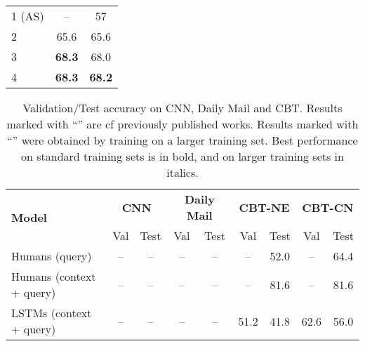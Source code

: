 \documentclass[11pt,a4paper]{article}
\begin{document}
\begin{table*}[ht]
{\begin{tabular}{@{}l|c|c@{}}
	&	&	\\ \midrule
1 (AS)                    & --               & 57             \\
2			                               & 65.6               & 65.6              \\
3                                & \textbf{68.3}               & 68.0              \\
4                                & \textbf{68.3}               & \textbf{68.2}              \\\bottomrule
\end{tabular}
}
\end{table*}

\begin{table*}[ht]
\caption{\small Validation/Test accuracy  on CNN, Daily Mail and CBT.
Results marked with ``'' are cf previously published works.
Results marked with ``'' were obtained by training on a larger training set. Best performance on standard training sets is in bold, and on larger training sets in italics.}
\label{tab:results}
\centering
\begin{tabular}{@{}l|cc|cc|cc|cc@{}}
\toprule
\multirow{2}{*}{\textbf{Model}}       & \multicolumn{2}{c|}{\textbf{CNN}}                     & \multicolumn{2}{c|}{\textbf{Daily Mail}}              & \multicolumn{2}{c|}{\textbf{CBT-NE}}           & \multicolumn{2}{c}{\textbf{CBT-CN}}          \\ \cmidrule(l){2-9} 
                                      & Val                      & Test                      & Val                      & Test                      & Val                   & Test                   & Val                   & Test                  \\ \midrule
Humans (query)                         & --                        & --                         & --                        & --                         & --                     & 52.0                   & --                     & 64.4                  \\
Humans (context + query)               & --                        & --                         & --                        & --                         & --                     & 81.6                   & --                     & 81.6                  \\ \midrule
LSTMs (context + query)                & --                        & --                         & --                        & --                         & 51.2                  & 41.8                   & 62.6                  & 56.0                  \\ 

\end{tabular}
\end{table*}
\end{document}
